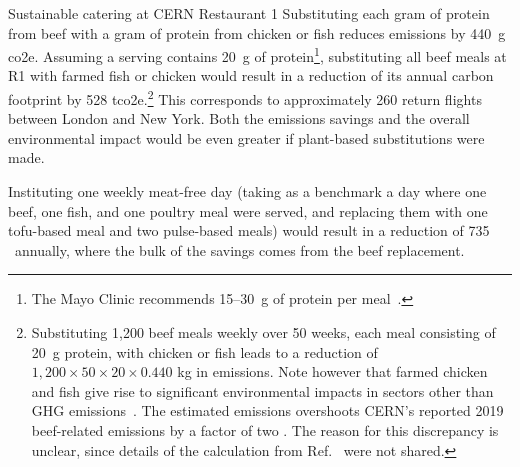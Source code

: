 \documentclass[../SustainableHEP.tex]{subfiles}
\begin{document}
\begin{casestudy}{Sustainable catering at CERN Restaurant 1}
    Substituting each gram of protein from beef with a gram of protein from chicken or fish reduces emissions by 440~g \acrshort{co2e}.  
    Assuming a serving contains 20~g of protein\footnote{The Mayo Clinic recommends 15--30~g of protein per meal~\cite{MAYO}.}, substituting all beef meals at R1 with farmed fish or chicken would result in a reduction of its annual carbon footprint by 528 \acrshort{tco2e}.\footnote{Substituting 1,200 beef meals weekly over 50 weeks, each meal consisting of 20~g protein, with chicken or fish leads to a reduction of $1,200\times 50\times 20\times 0.440$ kg \CdOe \; in emissions. Note however that farmed chicken and fish give rise to significant environmental impacts in sectors other than GHG emissions~\cite{KUEMPEL2023}.  The estimated emissions overshoots CERN's reported 2019 beef-related emissions by a factor of two \cite{HSENote}.  The reason for this discrepancy is unclear, since details of the calculation from Ref.~\cite{HSENote} were not shared.}
    This corresponds to approximately  260 return flights between London and New York. 
    Both the emissions savings and the overall environmental impact would be even greater if plant-based substitutions were made.

    Instituting one weekly meat-free day (taking as a benchmark a day where one beef, one fish, and one poultry meal were served, and replacing them with one tofu-based meal and two pulse-based meals) would result in a reduction of 735 \tCdOe\ annually, where the bulk of the savings comes from the beef replacement.
\end{casestudy}
\end{document}
